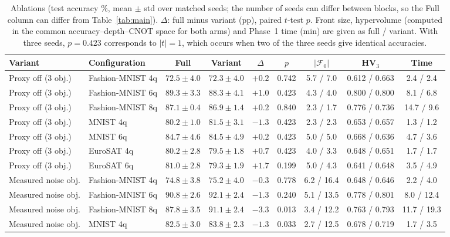 \begin{table}[t]
\caption{Ablations (test accuracy \%, mean $\pm$ std over matched seeds; the number of seeds can differ between blocks, so the Full column can differ from Table~\ref{tab:main}). $\Delta$: full minus variant (pp), paired $t$-test $p$. Front size, hypervolume (computed in the common accuracy--depth--CNOT space for both arms) and Phase~1 time (min) are given as full / variant. With three seeds, $p=0.423$ corresponds to $|t|=1$, which occurs when two of the three seeds give identical accuracies.}\label{tab:ablation}
\footnotesize\setlength\tabcolsep{3pt}
\begin{tabular}{@{}llccccccc@{}}
\toprule
Variant & Configuration & Full & Variant & $\Delta$ & $p$ & $|\mathcal{F}_0|$ & HV$_3$ & Time \\
\midrule
Proxy off (3 obj.) & Fashion-MNIST 4q & $72.5\pm4.0$ & $72.3\pm4.0$ & $+0.2$ & 0.742 & 5.7 / 7.0 & 0.612 / 0.663 & 2.4 / 2.4 \\
Proxy off (3 obj.) & Fashion-MNIST 6q & $89.3\pm3.3$ & $88.3\pm4.1$ & $+1.0$ & 0.423 & 4.3 / 4.0 & 0.800 / 0.800 & 8.1 / 6.8 \\
Proxy off (3 obj.) & Fashion-MNIST 8q & $87.1\pm0.4$ & $86.9\pm1.4$ & $+0.2$ & 0.840 & 2.3 / 1.7 & 0.776 / 0.736 & 14.7 / 9.6 \\
Proxy off (3 obj.) & MNIST 4q & $80.2\pm1.0$ & $81.5\pm3.1$ & $-1.3$ & 0.423 & 2.3 / 2.3 & 0.653 / 0.657 & 1.3 / 1.2 \\
Proxy off (3 obj.) & MNIST 6q & $84.7\pm4.6$ & $84.5\pm4.9$ & $+0.2$ & 0.423 & 5.0 / 5.0 & 0.668 / 0.636 & 4.7 / 3.6 \\
Proxy off (3 obj.) & EuroSAT 4q & $80.2\pm2.8$ & $79.5\pm1.8$ & $+0.7$ & 0.423 & 4.0 / 3.3 & 0.648 / 0.651 & 1.7 / 1.7 \\
Proxy off (3 obj.) & EuroSAT 6q & $81.0\pm2.8$ & $79.3\pm1.9$ & $+1.7$ & 0.199 & 5.0 / 4.3 & 0.641 / 0.648 & 3.5 / 4.9 \\
\midrule
Measured noise obj. & Fashion-MNIST 4q & $74.8\pm3.8$ & $75.2\pm4.0$ & $-0.3$ & 0.778 & 6.2 / 16.4 & 0.648 / 0.646 & 2.2 / 4.0 \\
Measured noise obj. & Fashion-MNIST 6q & $90.8\pm2.6$ & $92.1\pm2.4$ & $-1.3$ & 0.240 & 5.1 / 13.5 & 0.778 / 0.801 & 8.0 / 12.4 \\
Measured noise obj. & Fashion-MNIST 8q & $87.8\pm3.5$ & $91.1\pm2.4$ & $-3.3$ & 0.013 & 3.4 / 12.2 & 0.763 / 0.793 & 11.7 / 19.3 \\
Measured noise obj. & MNIST 4q & $82.5\pm3.0$ & $83.8\pm2.3$ & $-1.3$ & 0.033 & 2.7 / 12.5 & 0.678 / 0.719 & 1.7 / 3.5 \\

\end{tabular}
\end{table}
